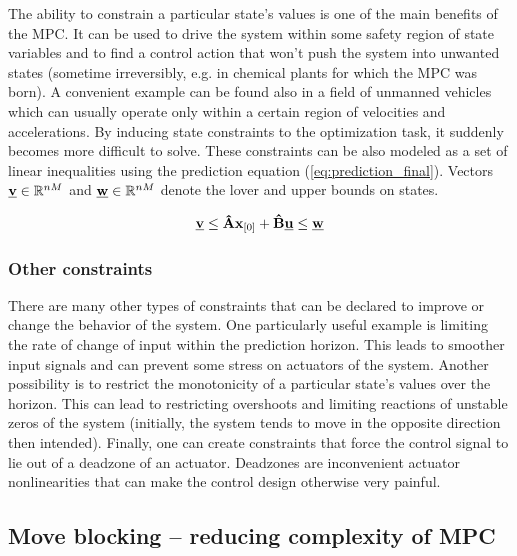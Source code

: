 The ability to constrain a particular state's values is one of the main benefits of the MPC. It can be used to drive the system within some safety region of state variables and to find a control action that won't push the system into unwanted states (sometime irreversibly, e.g. in chemical plants for which the MPC was born). A convenient example can be found also in a field of unmanned vehicles which can usually operate only within a certain region of velocities and accelerations. By inducing state constraints to the optimization task, it suddenly becomes more difficult to solve. These constraints can be also modeled as a set of linear inequalities using the prediction equation (\ref{eq:prediction_final}). Vectors $\textbf{\underline{v}} \in \mathbb{R}^{nM}$ and $\textbf{\underline{w}} \in \mathbb{R}^{nM}$ denote the lover and upper bounds on states.
 
\begin{equation}
\textbf{\underline{v}} \leq \textbf{\^A}\textbf{x}_{[0]} + \textbf{\^B}\textbf{\underline{u}} \leq \textbf{\underline{w}}
\end{equation}

\subsubsection{Other constraints}

There are many other types of constraints that can be declared to improve or change the behavior of the system. One particularly useful example is limiting the rate of change of input within the prediction horizon. This leads to smoother input signals and can prevent some stress on actuators of the system. Another possibility is to restrict the monotonicity of a particular state's values over the horizon. This can lead to restricting overshoots and limiting reactions of unstable zeros of the system (initially, the system tends to move in the opposite direction then intended). Finally, one can create constraints that force the control signal to lie out of a deadzone of an actuator. Deadzones are inconvenient actuator nonlinearities that can make the control design otherwise very painful.

\subsection{Move blocking -- reducing complexity of MPC}

